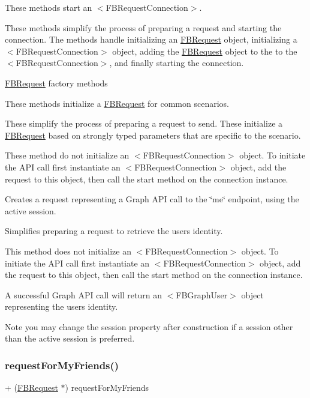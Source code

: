 These methods start an $<$\+F\+B\+Request\+Connection$>$.

These methods simplify the process of preparing a request and starting the connection. The methods handle initializing an {\ttfamily \hyperlink{interfaceFBRequest}{F\+B\+Request}} object, initializing a $<$\+F\+B\+Request\+Connection$>$ object, adding the {\ttfamily \hyperlink{interfaceFBRequest}{F\+B\+Request}} object to the to the $<$\+F\+B\+Request\+Connection$>$, and finally starting the connection.

\hyperlink{interfaceFBRequest}{F\+B\+Request} factory methods

These methods initialize a {\ttfamily \hyperlink{interfaceFBRequest}{F\+B\+Request}} for common scenarios.

These simplify the process of preparing a request to send. These initialize a {\ttfamily \hyperlink{interfaceFBRequest}{F\+B\+Request}} based on strongly typed parameters that are specific to the scenario.

These method do not initialize an $<$\+F\+B\+Request\+Connection$>$ object. To initiate the A\+PI call first instantiate an $<$\+F\+B\+Request\+Connection$>$ object, add the request to this object, then call the {\ttfamily start} method on the connection instance.

Creates a request representing a Graph A\+PI call to the \char`\"{}me\char`\"{} endpoint, using the active session.

Simplifies preparing a request to retrieve the user\textquotesingle{}s identity.

This method does not initialize an $<$\+F\+B\+Request\+Connection$>$ object. To initiate the A\+PI call first instantiate an $<$\+F\+B\+Request\+Connection$>$ object, add the request to this object, then call the {\ttfamily start} method on the connection instance.

A successful Graph A\+PI call will return an $<$\+F\+B\+Graph\+User$>$ object representing the user\textquotesingle{}s identity.

Note you may change the session property after construction if a session other than the active session is preferred. \mbox{\label{interfaceFBRequest_a95570ea8628f71b3c311da8378729cc6}} 
\subsubsection{\texorpdfstring{request\+For\+My\+Friends()}{requestForMyFriends()}\hspace{0.1cm}{\footnotesize\ttfamily [1/5]}}
{\footnotesize\ttfamily + (\hyperlink{interfaceFBRequest}{F\+B\+Request} $\ast$) request\+For\+My\+Friends \begin{DoxyParamCaption}{ }\end{DoxyParamCaption}}

